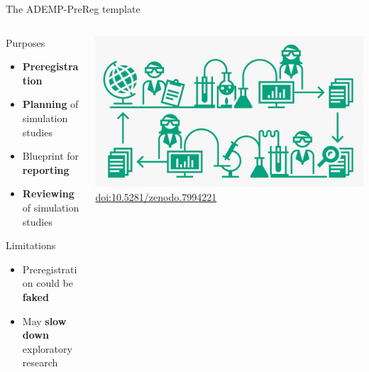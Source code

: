 \documentclass[english, 12pt, aspectratio=169]{beamer}
\begin{document}
\begin{frame}{The ADEMP-PreReg template}
  \begin{columns}
    \begin{column}{0.6\textwidth}

  \begin{block}{Purposes}
    \begin{itemize}
      \pause
      \item \alert{\textbf{Preregistration}}
      \pause
      \item \alert{\textbf{Planning}} of simulation studies
      \pause
      \item Blueprint for \alert{\textbf{reporting}}
      \pause
      \item \alert{\textbf{Reviewing}} of simulation studies
    \end{itemize}
  \end{block}

  \begin{block}{Limitations}
    \begin{itemize}
    \pause
      \item Preregistration could be \alert{\textbf{faked}}
    \pause
      \item May \alert{\textbf{slow down}} exploratory research
    \end{itemize}

  \end{block}
  \end{column}
  \begin{column}{0.4\textwidth}
\centering
    \includegraphics[width=\textwidth]{pics/CRScycle.JPG} \\
    {\tiny \color{gray} \href{https://zenodo.org/doi/10.5281/zenodo.7994221}{doi:10.5281/zenodo.7994221}}


  \end{column}
\end{columns}
\end{frame}
\end{document}
